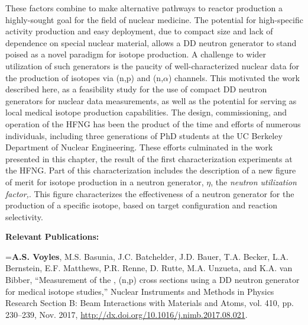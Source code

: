 These factors combine to make alternative pathways to reactor production a highly-sought goal for the field of nuclear medicine.
The potential for high-specific activity production and easy deployment, due to compact size and lack of dependence on special nuclear material, allows a DD neutron generator to stand poised as a novel paradigm for isotope production.
A challenge to wider utilization of  such generators  is the paucity of well-characterized nuclear data for the production of isotopes via (n,p) and (n,$\alpha$) channels.
This motivated the work described here, as a feasibility study for the use of compact DD neutron generators for nuclear data measurements, as well as the potential for serving as local medical isotope production capabilities.
The design, commissioning, and operation of the HFNG has been the product of the time and efforts of numerous individuals, including three generations of PhD students at the UC Berkeley Department of Nuclear Engineering. 
These efforts culminated in the work presented in this chapter, the result of the first characterization experiments  at the HFNG.
Part of this characterization includes the description of a new figure of merit for isotope production in a neutron generator, $\eta$, the \emph{neutron utilization factor,}.
This figure  characterizes the effectiveness of a neutron generator for the production of a specific isotope, based on target configuration and reaction selectivity.


\vspace{1cm}



\noindent \textbf{Relevant Publications:}

\vspace{0.5cm}


\hangindent=\parindent  \textbf{A.S. Voyles}, M.S. Basunia, J.C. Batchelder, J.D. Bauer, T.A. Becker, L.A. Bernstein, E.F. Matthews, P.R. Renne, D. Rutte, M.A. Unzueta, and K.A. van Bibber, \enquote{Measurement of the , (n,p) cross sections using a DD neutron generator for medical isotope studies,} Nuclear Instruments and Methods in Physics Research Section B: Beam Interactions with Materials and Atoms, vol. 410, pp. 230--239, Nov. 2017, \url{http://dx.doi.org/10.1016/j.nimb.2017.08.021}. \cite{Voyles2017} 


